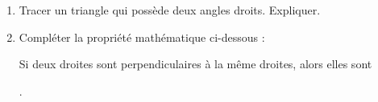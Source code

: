 \documentclass[activite]{thedocument}
\begin{document}
    \begin{enumerate}
        \item Tracer un triangle qui possède deux angles droits. Expliquer.
        \vskip 250pt
        \item Compléter la propriété mathématique ci-dessous :
        \begin{mdframed}
            Si deux droites sont perpendiculaires à la même droites, alors elles
            sont \par\doted{5cm}.
        \end{mdframed}
    \end{enumerate}
\end{document}
